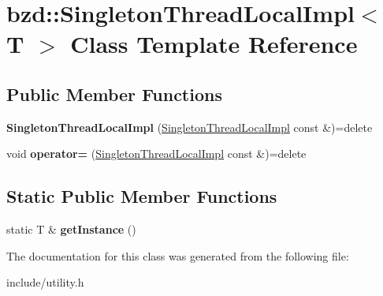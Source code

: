 \hypertarget{classbzd_1_1SingletonThreadLocalImpl}{}\section{bzd\+:\+:Singleton\+Thread\+Local\+Impl$<$ T $>$ Class Template Reference}
\label{classbzd_1_1SingletonThreadLocalImpl}
\subsection*{Public Member Functions}
\begin{DoxyCompactItemize}
\item 
\mbox{\label{classbzd_1_1SingletonThreadLocalImpl_a1779b281bafb24fc15a4bde2ceb95d99}} 
{\bfseries Singleton\+Thread\+Local\+Impl} (\hyperlink{classbzd_1_1SingletonThreadLocalImpl}{Singleton\+Thread\+Local\+Impl} const \&)=delete
\item 
\mbox{\label{classbzd_1_1SingletonThreadLocalImpl_a8321bf0aa328bbf78130e712fe1941fc}} 
void {\bfseries operator=} (\hyperlink{classbzd_1_1SingletonThreadLocalImpl}{Singleton\+Thread\+Local\+Impl} const \&)=delete
\end{DoxyCompactItemize}
\subsection*{Static Public Member Functions}
\begin{DoxyCompactItemize}
\item 
\mbox{\label{classbzd_1_1SingletonThreadLocalImpl_ae16a19015400e03515d16f65ac014f32}} 
static T \& {\bfseries get\+Instance} ()
\end{DoxyCompactItemize}


The documentation for this class was generated from the following file\+:\begin{DoxyCompactItemize}
\item 
include/utility.\+h\end{DoxyCompactItemize}
